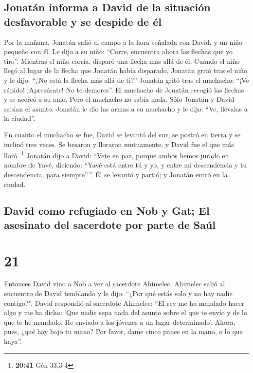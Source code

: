 \hypertarget{jonatuxe1n-informa-a-david-de-la-situaciuxf3n-desfavorable-y-se-despide-de-uxe9l}{%
\subsection{Jonatán informa a David de la situación desfavorable y se
despide de
él}\label{jonatuxe1n-informa-a-david-de-la-situaciuxf3n-desfavorable-y-se-despide-de-uxe9l}}

 Por la mañana, Jonatán salió al campo a la hora señalada
con David, y un niño pequeño con él.  Le dijo a su niño:
``Corre, encuentra ahora las flechas que yo tiro''. Mientras el niño
corría, disparó una flecha más allá de él.  Cuando el
niño llegó al lugar de la flecha que Jonatán había disparado, Jonatán
gritó tras el niño y le dijo: ``¿No está la flecha más allá de ti?''
 Jonatán gritó tras el muchacho: ``¡Ve rápido!
¡Apresúrate! No te demores''. El muchacho de Jonatán recogió las flechas
y se acercó a su amo.  Pero el muchacho no sabía nada.
Sólo Jonatán y David sabían el asunto.  Jonatán le dio
las armas a su muchacho y le dijo: ``Ve, llévalas a la ciudad''.

 En cuanto el muchacho se fue, David se levantó del sur,
se postró en tierra y se inclinó tres veces. Se besaron y lloraron
mutuamente, y David fue el que más lloró. \footnote{\textbf{20:41} Gén
  33,3-4}  Jonatán dijo a David: ``Vete en paz, porque
ambos hemos jurado en nombre de Yavé, diciendo: ``Yavé está entre tú y
yo, y entre mi descendencia y tu descendencia, para siempre''\,''. Él se
levantó y partió; y Jonatán entró en la ciudad.

\hypertarget{david-como-refugiado-en-nob-y-gat-el-asesinato-del-sacerdote-por-parte-de-sauxfal}{%
\subsection{David como refugiado en Nob y Gat; El asesinato del
sacerdote por parte de
Saúl}\label{david-como-refugiado-en-nob-y-gat-el-asesinato-del-sacerdote-por-parte-de-sauxfal}}

\hypertarget{section-20}{%
\section{21}\label{section-20}}

 Entonces David vino a Nob a ver al sacerdote Ahimelec.
Ahimelec salió al encuentro de David temblando y le dijo: ``¿Por qué
estás solo y no hay nadie contigo?''.  David respondió al
sacerdote Ahimelec: ``El rey me ha mandado hacer algo y me ha dicho:
`Que nadie sepa nada del asunto sobre el que te envío y de lo que te he
mandado. He enviado a los jóvenes a un lugar determinado'.
 Ahora, pues, ¿qué hay bajo tu mano? Por favor, dame cinco
panes en la mano, o lo que haya''.


